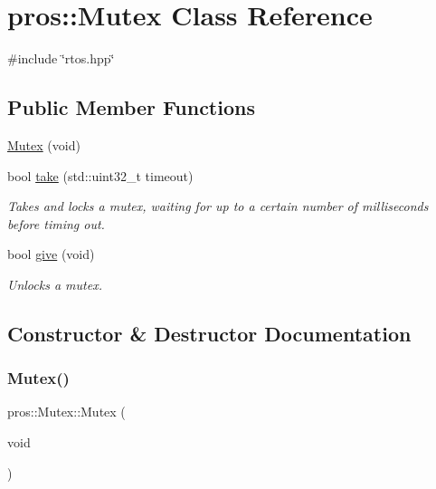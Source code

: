 \hypertarget{classpros_1_1Mutex}{}\section{pros\+:\+:Mutex Class Reference}
\label{classpros_1_1Mutex}


{\ttfamily \#include \char`\"{}rtos.\+hpp\char`\"{}}

\subsection*{Public Member Functions}
\begin{DoxyCompactItemize}
\item 
\hyperlink{classpros_1_1Mutex_a96d568fada90acb8b79d82a3687f8f18}{Mutex} (void)
\item 
bool \hyperlink{classpros_1_1Mutex_a70da733375f7b4b68475881578c78516}{take} (std\+::uint32\+\_\+t timeout)
\begin{DoxyCompactList}\small\item\em Takes and locks a mutex, waiting for up to a certain number of milliseconds before timing out. \end{DoxyCompactList}\item 
bool \hyperlink{classpros_1_1Mutex_a1c3e7ee193608a27a5a509ee7930363b}{give} (void)
\begin{DoxyCompactList}\small\item\em Unlocks a mutex. \end{DoxyCompactList}\end{DoxyCompactItemize}


\subsection{Constructor \& Destructor Documentation}
\mbox{\label{classpros_1_1Mutex_a96d568fada90acb8b79d82a3687f8f18}} 
\subsubsection{\texorpdfstring{Mutex()}{Mutex()}}
{\footnotesize\ttfamily pros\+::\+Mutex\+::\+Mutex (\begin{DoxyParamCaption}\item[{void}]{ }\end{DoxyParamCaption})}



